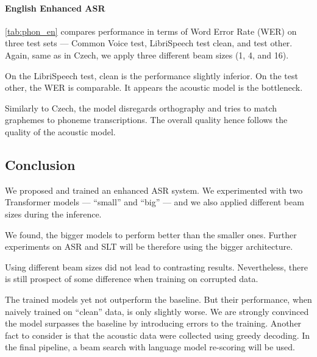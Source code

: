 \paragraph{English Enhanced ASR}
\cref{tab:phon_en} compares performance in terms of Word Error Rate (WER) on three test sets --- Common Voice test, LibriSpeech test clean, and test other. Again, same as in Czech, we apply three different beam sizes (1, 4, and 16).

On the LibriSpeech test, clean is the performance slightly inferior. On the test other, the WER is comparable. It appears the acoustic model is the bottleneck. 

Similarly to Czech, the model disregards orthography and tries to match graphemes to phoneme transcriptions. The overall quality hence follows the quality of the acoustic model.

\subsection{Conclusion}
\label{easr:conclusion}
We proposed and trained an enhanced ASR system. We experimented with two Transformer models --- ``small'' and ``big'' --- and we also applied different beam sizes during the inference. 

We found, the bigger models to perform better than the smaller ones. Further experiments on ASR and SLT will be therefore using the bigger architecture.

Using different beam sizes did not lead to contrasting results. Nevertheless, there is still prospect of some difference when training on corrupted data.

The trained models yet not outperform the baseline. But their performance, when naively trained on ``clean'' data, is only slightly worse. We are strongly convinced the model surpasses the baseline by introducing errors to the training. Another fact to consider is that the acoustic data were collected using greedy decoding. In the final pipeline, a beam search with language model re-scoring will be used. 
